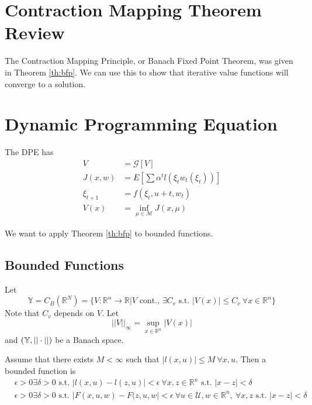 
\mainmatter
\setcounter{page}{1}

\lectureseries[\course]{\course}

\date{October 22, 2009}

\setaddress

\setcounter{lecture}{7}
\setcounter{chapter}{7}


\section{Contraction Mapping Theorem Review}
The Contraction Mapping Principle, or Banach Fixed Point Theorem, was given in Theorem \ref{th:bfp}. We can use this to show that iterative value functions will converge to a solution.

\section{Dynamic Programming Equation}
The DPE has
\begin{align*}
V&=\mathcal{G}[V] \\
J(x,w) &= E[\sum\alpha^tl(\xi_tw_t(\xi_t))] \\
\xi_{t+1} &= f(\xi_t,u+t,w_t) \\
V(x) &= \inf_{\mu\in\mathcal{M}}J(x,\mu)
\end{align*}

We want to apply Theorem \ref{th:bfp} to bounded functions.

\subsection{Bounded Functions}
Let
$$\mathbb{Y} = C_B(\mathbb{R}^N) = \{V:\mathbb{R}^n\to\mathbb{R} | V \text{ cont., } \exists C_v \text{ s.t. } |V(x)|\leq C_v ~\forall x\in\mathbb{R}^n\}$$
Note that $C_v$ depends on $V$. Let
$$||V||_\infty = \sup_{x\in\mathbb{R}^n}|V(x)|$$
and $(\mathbb{Y},||\cdot||)$ be a Banach space.

Assume that there exists $M<\infty$ such that $|l(x,u)|\leq M ~\forall x,u$. Then a bounded function is
\begin{align*}
&\epsilon>0 \exists \delta>0 \text{ s.t. } |l(x,u)-l(z,u)|<\epsilon ~\forall x,z\in\mathbb{R}^n \text{ s.t. } |x-z|<\delta \\
&\epsilon>0 \exists \delta>0 \text{ s.t. } |F(x,u,w)-F(z,u,w|<\epsilon ~\forall u\in\mathcal{U},w\in\mathbb{R}^n, ~\forall x,z \text{ s.t. } |x-z|<\delta
\end{align*}

